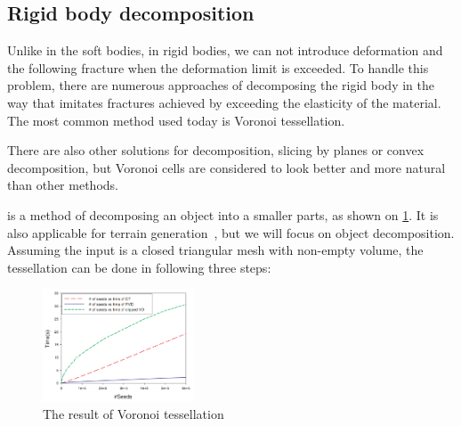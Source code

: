 \subsection{Rigid body decomposition}
Unlike in the soft bodies, in rigid bodies, we can not introduce deformation and the following fracture when the deformation limit is exceeded. To handle this problem, there are numerous approaches of decomposing the rigid body in the way that imitates fractures achieved by exceeding the elasticity of the material. The most common method used today is Voronoi tessellation.

There are also other solutions for decomposition, \eg slicing by planes or convex decomposition, but Voronoi cells are considered to look better and more natural than other methods. 

 is a method of decomposing an object into a smaller parts, as shown on \cref{fig:voro}. It is also applicable for \eg terrain generation~\cite{voronoiterrainrealtime}, but we will focus on object decomposition. Assuming the input is a closed triangular mesh with non-empty volume, the tessellation can be done in following three steps:

\begin{figure}
        \centering
        \includegraphics[width=0.4\textwidth]{img/clipped}
        \caption{The result of Voronoi tessellation \cite{yan2010efficient}}
        \label{fig:voro}
\end{figure}

